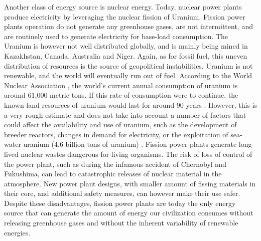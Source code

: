 \documentclass[my_thesis.tex]{subfiles}
\begin{document}
Another class of energy source is nuclear energy. Today, nuclear power plants produce electricity by leveraging the nuclear fission of Uranium. Fission power plants operation do not generate any greenhouse gases, are not intermittent, and are routinely used to generate electricity for base-load consumption. The Uranium is however not well distributed globally, and is mainly being mined in Kazakhstan, Canada, Australia and Niger. Again, as for fossil fuel, this uneven distribution of resources is the source of geopolitical instabilities. Uranium is not renewable, and the world will eventually run out of fuel. According to the World Nuclear Association \citep{worldnuclearassociationUraniumSuppliesSupply2022}, the world's current annual consumption of uranium is around 61,000 metric tons. If this rate of consumption were to continue, the known land resources of uranium would last for around 90 years . However, this is a very rough estimate and does not take into account a number of factors that could affect the availability and use of uranium, such as the development of breeder reactors, changes in demand for electricity, or the exploitation of sea-water uranium ($4.6$ billion tons of uranium) \citep{dunganUraniumSeawaterInfinite2017}. Fission power plants generate long-lived nuclear wastes dangerous for living organisms. The risk of loss of control of the power plant, such as during the infamous accident of Chernobyl and Fukushima, can lead to catastrophic releases of nuclear material in the atmosphere. New power plant designs, with smaller amount of fissing materials in their core, and additional safety measures, can however make their use safer.  Despite these disadvantages, fission power plants are today the only energy source that can generate the amount of energy our civilization consumes without releasing greenhouse gases and without the inherent variability of renewable energies.
\end{document}
